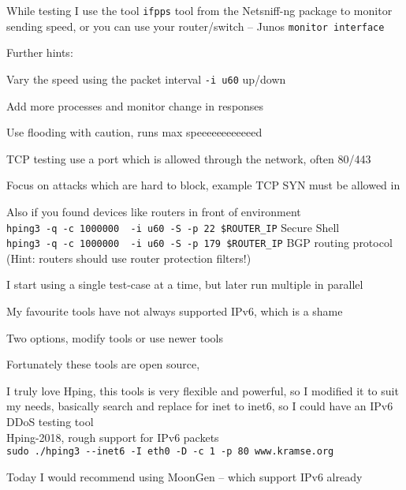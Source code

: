 \documentclass[Screen16to9,17pt]{foils}
\begin{document}
While testing I use the tool \verb+ifpps+ tool from the Netsniff-ng package  to monitor sending speed, or you can use your router/switch -- Junos \verb+monitor interface+



Further hints:
\begin{list2}
\item Vary the speed using the packet interval \verb+-i u60+ up/down
\item Add more processes and monitor change in responses
\item Use flooding with caution, runs max speeeeeeeeeeeed \smiley
\item TCP testing use a port which is allowed through the network, often 80/443
\item Focus on attacks which are hard to block, example TCP SYN must be allowed in
\item Also if you found devices like routers in front of environment\\
\verb+hping3 -q -c 1000000  -i u60 -S -p 22 $ROUTER_IP+ Secure Shell\\
\verb+hping3 -q -c 1000000  -i u60 -S -p 179 $ROUTER_IP+ BGP routing protocol\\
(Hint: routers should use router protection filters!)
\end{list2}

I start using a single test-case at a time, but later run multiple in parallel


My favourite tools have not always supported IPv6, which is a shame

Two options, modify tools or use newer tools

\begin{list2}
\item Fortunately these tools are open source,

\item I truly love Hping, this tools is very flexible and powerful, so I modified it to suit my needs, basically search and replace for inet to inet6, so I could have an IPv6 DDoS testing tool\\
 Hping-2018, rough support for IPv6 packets\\
\verb+sudo ./hping3 --inet6 -I eth0 -D -c 1 -p 80 www.kramse.org+

\item Today I would recommend using MoonGen -- which support IPv6 already\\
\end{list2}
\end{document}
